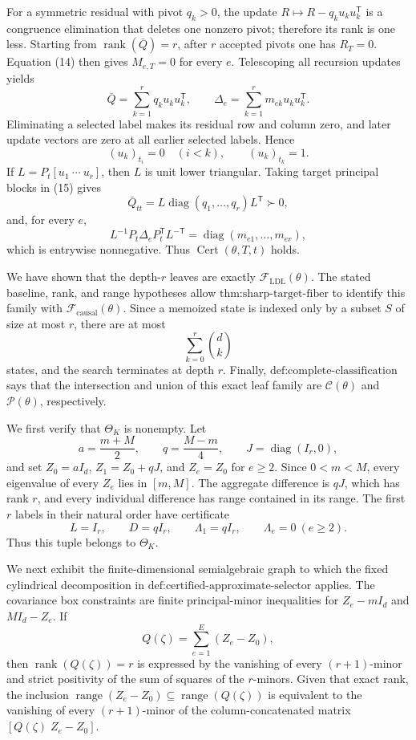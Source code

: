 For a symmetric residual with pivot \(q_k>0\), the update \(R\mapsto R-q_ku_ku_k^{\mathsf T}\) is a congruence elimination that deletes one nonzero pivot; therefore its rank is one less.  Starting from \(\operatorname{rank}(\bar Q)=r\), after \(r\) accepted pivots one has \(R_T=0\).  Equation (14) then gives \(M_{e,T}=0\) for every \(e\).  Telescoping all recursion updates yields
\[
 \bar Q=\sum_{k=1}^r q_ku_ku_k^{\mathsf T},
 \qquad
 \Delta_e=\sum_{k=1}^r m_{ek}u_ku_k^{\mathsf T}. \tag{15}
\]
Eliminating a selected label makes its residual row and column zero, and later update vectors are zero at all earlier selected labels.  Hence
\[
 (u_k)_{t_i}=0\quad(i<k),\qquad (u_k)_{t_k}=1.
\]
If \(L=P_t[u_1\ \cdots\ u_r]\), then \(L\) is unit lower triangular.  Taking target principal blocks in (15) gives
\[
 \bar Q_{tt}=L\operatorname{diag}(q_1,\ldots,q_r)L^{\mathsf T}\succ0,
\]
and, for every \(e\),
\[
 L^{-1}P_t\Delta_eP_t^{\mathsf T}L^{-\mathsf T}
 =\operatorname{diag}(m_{e1},\ldots,m_{er}), \tag{16}
\]
which is entrywise nonnegative.  Thus \(\operatorname{Cert}(\theta,T,t)\) holds.

We have shown that the depth-\(r\) leaves are exactly \(\mathcal F_{\mathrm{LDL}}(\theta)\).  The stated baseline, rank, and range hypotheses allow \(\text{thm:sharp-target-fiber}\) to identify this family with \(\mathcal F_{\mathrm{causal}}(\theta)\).  Since a memoized state is indexed only by a subset \(S\) of size at most \(r\), there are at most
\[
 \sum_{k=0}^r\binom{d}{k}
\]
states, and the search terminates at depth \(r\).  Finally, \(\text{def:complete-classification}\) says that the intersection and union of this exact leaf family are \(\mathcal C(\theta)\) and \(\mathcal P(\theta)\), respectively.

We first verify that \(\Theta_K\) is nonempty.  Let
\[
 a=\frac{m+M}{2},\qquad q=\frac{M-m}{4},\qquad
 J=\operatorname{diag}(I_r,0),
\]
and set \(Z_0=aI_d\), \(Z_1=Z_0+qJ\), and \(Z_e=Z_0\) for \(e\ge2\).  Since \(0<m<M\), every eigenvalue of every \(Z_e\) lies in \([m,M]\).  The aggregate difference is \(qJ\), which has rank \(r\), and every individual difference has range contained in its range.  The first \(r\) labels in their natural order have certificate
\[
 L=I_r,\qquad D=qI_r,\qquad
 \Lambda_1=qI_r,\qquad \Lambda_e=0\ (e\ge2).
\]
Thus this tuple belongs to \(\Theta_K\).

We next exhibit the finite-dimensional semialgebraic graph to which the fixed cylindrical decomposition in \(\text{def:certified-approximate-selector}\) applies.  The covariance box constraints are finite principal-minor inequalities for \(Z_e-mI_d\) and \(MI_d-Z_e\).  If
\[
 Q(\zeta)=\sum_{e=1}^E(Z_e-Z_0),
\]
then \(\operatorname{rank}(Q(\zeta))=r\) is expressed by the vanishing of every \((r+1)\)-minor and strict positivity of the sum of squares of the \(r\)-minors.  Given that exact rank, the inclusion
\(\operatorname{range}(Z_e-Z_0)\subseteq\operatorname{range}(Q(\zeta))\) is equivalent to the vanishing of every \((r+1)\)-minor of the column-concatenated matrix \([Q(\zeta)\; Z_e-Z_0]\).

